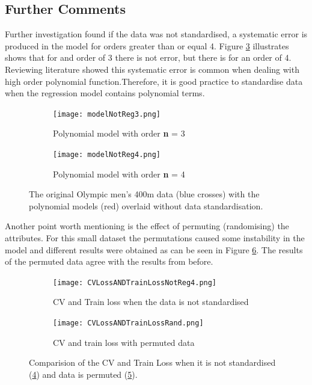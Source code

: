 {\subsection{Further Comments}
Further investigation found if the data was not standardised, a systematic error is produced in the model for orders greater than or equal 4. Figure \ref{men400-1noSt} illustrates shows that for and order of 3 there is not error, but there is for an order of 4. Reviewing literature showed this systematic error is common when dealing with high order polynomial function\cite{WhenIsIt}.Therefore, it is good practice to standardise data when the regression model contains polynomial terms.

\begin{figure}[h!] 
	\centering
	\begin{subfigure}[b]{0.4\textwidth}
		\texttt{[image: modelNotReg3.png]}
		\caption{Polynomial model with order \textbf{n} = 3}
		\label{fig:modelNoReg0}
	\end{subfigure}
	\begin{subfigure}[b]{0.4\textwidth}
		\texttt{[image: modelNotReg4.png]}
		\caption{Polynomial model with order \textbf{n} = 4}
		\label{fig:modelNoReg1}
	\end{subfigure}
	\caption{The original Olympic men's 400m data (blue crosses) with the polynomial models (red) overlaid without data standardisation.}
	\label{men400-1noSt}
\end{figure}

Another point worth mentioning is the effect of permuting (randomising) the attributes. For this small dataset the permutations caused some instability in the model and different results were obtained as can be seen in Figure \ref{men400CVRandSt}. The results of the permuted data agree with the results from before.

\begin{figure}[h!] 
	\centering
	\begin{subfigure}[b]{0.35\textwidth}
		\texttt{[image: CVLossANDTrainLossNotReg4.png]}
		\caption{CV and Train loss when the data is not standardised}
		\label{fig:modelNoRegCV}
	\end{subfigure}
	\begin{subfigure}[b]{0.35\textwidth}
		\texttt{[image: CVLossANDTrainLossRand.png]}
		\caption{CV and train loss with permuted data}
		\label{fig:modelRand}
	\end{subfigure}
	\caption{Comparision of the CV and Train Loss when it is not standardised (\ref{fig:modelNoRegCV}) and data is permuted (\ref{fig:modelRand}).}
	\label{men400CVRandSt}
\end{figure}

}
